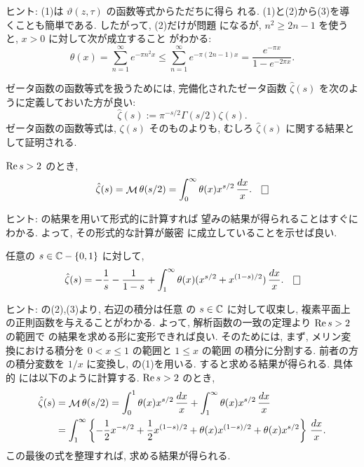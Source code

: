 \documentclass[12pt,twoside]{jarticle}
\begin{document}
\noindent ヒント: (1)は $\vartheta(z,\tau)$ の函数等式からただちに得ら
れる. (1)と(2)から(3)を導くことも簡単である. したがって, (2)だけが問題
になるが, $n^2 \ge 2n - 1$ を使うと, $x > 0$ に対して次が成立すること
がわかる:
\[
  \theta(x)
  =
  \sum_{n=1}^\infty e^{-\pi n^2 x}
  \le
  \sum_{n=1}^\infty e^{-\pi(2n - 1)x}
  =
  \frac{e^{-\pi x}}{1 - e^{-2\pi x}}.
\]%

ゼータ函数の函数等式を扱うためには, 完備化されたゼータ函数 %
$\hat\zeta(s)$ を次のように定義しておいた方が良い:
\[
  \hat\zeta(s) := \pi^{-s/2} \Gamma(s/2) \zeta(s).
\]%
ゼータ函数の函数等式は, $\zeta(s)$ そのものよりも, むしろ 
$\hat\zeta(s)$ に関する結果として証明される. 


\begin{question}[テータ函数とゼータ函数の関係]\label{q:Theta-and-Zeta}
  $\mathop{\mathrm{Re}}\nolimits s > 2$ のとき,
  \[
    \hat\zeta(s)
    = \Mellin \theta(s/2)
    = \int_0^\infty \theta(x) x^{s/2}\,\frac{dx}{x}.
  \qed
  \]
\end{question}

\noindent ヒント:  の結果を用いて形式的に計算すれば
望みの結果が得られることはすぐにわかる. よって, その形式的な計算が厳密
に成立していることを示せば良い.

\begin{question}[積分表示式 2]\label{q:Zeta-int2}
  任意の $s\in{\mathbb C} - \{0,1\}$ に対して, 
  \[
    \hat\zeta(s)
    =
    - \frac{1}{s}
    - \frac{1}{1-s}
    + \int_1^\infty \theta(x) (x^{s/2} + x^{(1-s)/2}) \,\frac{dx}{x}.
  \qed
  \]
\end{question}

\noindent ヒント: の(2),(3)より, 右辺の積分は任意
の $s\in{\mathbb C}$ に対して収束し, 複素平面上の正則函数を与えることがわかる. 
よって, 解析函数の一致の定理より $\mathop{\mathrm{Re}}\nolimits s > 2$ の範囲で 
 の結果を求める形に変形できれば良い. そのためには, 
まず, メリン変換における積分を $0 < x \le 1$ の範囲と $1\le x$ の範囲
の積分に分割する. 前者の方の積分変数を $1/x$ に変換し, %
の(1)を用いる. すると求める結果が得られる. 具体的
には以下のように計算する. $\mathop{\mathrm{Re}}\nolimits s > 2$ のとき,
\begin{align*}
  \hat\zeta(s)
  & = \mathop{\mathcal{M}}\nolimits \theta(s/2)
    = \int_0^1      \theta(x) x^{s/2}\,\frac{dx}{x}
    + \int_1^\infty \theta(x) x^{s/2}\,\frac{dx}{x}
  \\
  & = \int_1^\infty 
        \left\{
          - \frac{1}{2}x^{-s/2}
          + \frac{1}{2}x^{(1-s)/2}
          + \theta(x) x^{(1-s)/2}
          + \theta(x) x^{s/2}
        \right\}
      \,\frac{dx}{x}.
\end{align*}
この最後の式を整理すれば, 求める結果が得られる. 
\end{document}
